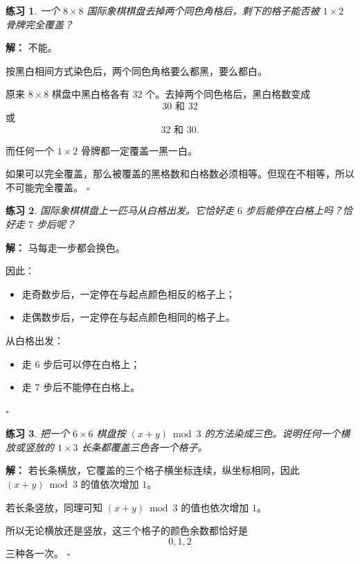 \documentclass[11pt,a4paper,fontset=fandol]{ctexart}
\theoremstyle{formaltheorem}
\theoremstyle{formalexample}
\newtheorem{exercise}{练习}[section]
\newenvironment{solution}{\par\noindent\textbf{解：}}{\hfill$\square$\par}
\begin{document}
\begin{exercise}
一个 $8\times 8$ 国际象棋棋盘去掉两个同色角格后，剩下的格子能否被 $1\times 2$ 骨牌完全覆盖？
\end{exercise}

\begin{solution}
不能。

按黑白相间方式染色后，两个同色角格要么都黑，要么都白。

原来 $8\times 8$ 棋盘中黑白格各有 $32$ 个。去掉两个同色格后，黑白格数变成
\[
30\text{ 和 }32
\]
或
\[
32\text{ 和 }30.
\]

而任何一个 $1\times 2$ 骨牌都一定覆盖一黑一白。

如果可以完全覆盖，那么被覆盖的黑格数和白格数必须相等。但现在不相等，所以不可能完全覆盖。
\end{solution}

\begin{exercise}
国际象棋棋盘上一匹马从白格出发。它恰好走 $6$ 步后能停在白格上吗？恰好走 $7$ 步后呢？
\end{exercise}

\begin{solution}
马每走一步都会换色。

因此：
\begin{itemize}
  \item 走奇数步后，一定停在与起点颜色相反的格子上；
  \item 走偶数步后，一定停在与起点颜色相同的格子上。
\end{itemize}

从白格出发：
\begin{itemize}
  \item 走 $6$ 步后可以停在白格上；
  \item 走 $7$ 步后不能停在白格上。
\end{itemize}
\end{solution}

\begin{exercise}
把一个 $6\times 6$ 棋盘按 $(x+y)\bmod 3$ 的方法染成三色。说明任何一个横放或竖放的 $1\times 3$ 长条都覆盖三色各一个格子。
\end{exercise}

\begin{solution}
若长条横放，它覆盖的三个格子横坐标连续，纵坐标相同，因此 $(x+y)\bmod 3$ 的值依次增加 $1$。

若长条竖放，同理可知 $(x+y)\bmod 3$ 的值也依次增加 $1$。

所以无论横放还是竖放，这三个格子的颜色余数都恰好是
\[
0,1,2
\]
三种各一次。
\end{solution}
\end{document}
